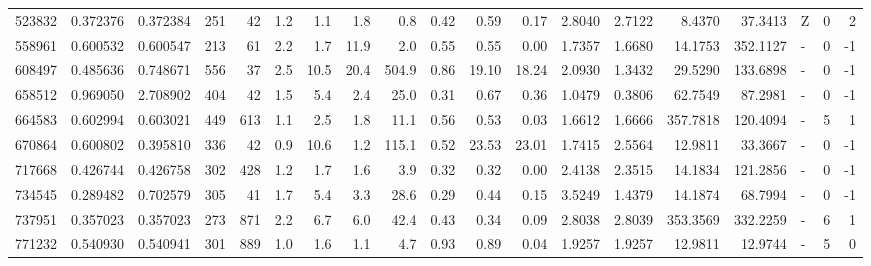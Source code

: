 \begin{tabular}{rrrrrrrrrrrrrrrrlrr}
    523832 & 0.372376 &   0.372384 &  251 &   42 &      1.2 &      1.1 &     1.8 &      0.8 &       0.42 &        0.59 &        0.17 &  2.8040 &  2.7122 &    8.4370 &   37.3413 &             Z &        0 &          2 \\
    558961 & 0.600532 &   0.600547 &  213 &   61 &      2.2 &      1.7 &    11.9 &      2.0 &       0.55 &        0.55 &        0.00 &  1.7357 &  1.6680 &   14.1753 &  352.1127 &             - &        0 &         -1 \\
    608497 & 0.485636 &   0.748671 &  556 &   37 &      2.5 &     10.5 &    20.4 &    504.9 &       0.86 &       19.10 &       18.24 &  2.0930 &  1.3432 &   29.5290 &  133.6898 &             - &        0 &         -1 \\
    658512 & 0.969050 &   2.708902 &  404 &   42 &      1.5 &      5.4 &     2.4 &     25.0 &       0.31 &        0.67 &        0.36 &  1.0479 &  0.3806 &   62.7549 &   87.2981 &             - &        0 &         -1 \\
    664583 & 0.602994 &   0.603021 &  449 &  613 &      1.1 &      2.5 &     1.8 &     11.1 &       0.56 &        0.53 &        0.03 &  1.6612 &  1.6666 &  357.7818 &  120.4094 &             - &        5 &          1 \\
    670864 & 0.600802 &   0.395810 &  336 &   42 &      0.9 &     10.6 &     1.2 &    115.1 &       0.52 &       23.53 &       23.01 &  1.7415 &  2.5564 &   12.9811 &   33.3667 &             - &        0 &         -1 \\
    717668 & 0.426744 &   0.426758 &  302 &  428 &      1.2 &      1.7 &     1.6 &      3.9 &       0.32 &        0.32 &        0.00 &  2.4138 &  2.3515 &   14.1834 &  121.2856 &             - &        0 &         -1 \\
    734545 & 0.289482 &   0.702579 &  305 &   41 &      1.7 &      5.4 &     3.3 &     28.6 &       0.29 &        0.44 &        0.15 &  3.5249 &  1.4379 &   14.1874 &   68.7994 &             - &        0 &         -1 \\
    737951 & 0.357023 &   0.357023 &  273 &  871 &      2.2 &      6.7 &     6.0 &     42.4 &       0.43 &        0.34 &        0.09 &  2.8038 &  2.8039 &  353.3569 &  332.2259 &             - &        6 &          1 \\
    771232 & 0.540930 &   0.540941 &  301 &  889 &      1.0 &      1.6 &     1.1 &      4.7 &       0.93 &        0.89 &        0.04 &  1.9257 &  1.9257 &   12.9811 &   12.9744 &             - &        5 &          0 \\

\end{tabular}
